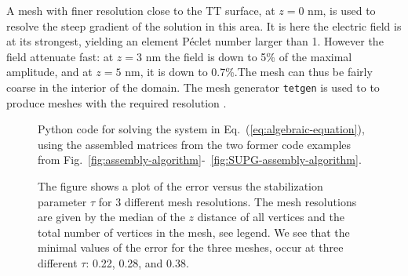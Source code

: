 A mesh with finer resolution close to the TT surface, at $z=0$ nm, is used to resolve the steep gradient of the solution in this area. It is here the electric field is at its strongest, yielding an element P\'eclet number larger than 1. However the field attenuate fast: at $z=3$ nm the field is down to 5\% of the maximal amplitude, and at $z=5$ nm, it is down to 0.7\%.The mesh can thus be fairly coarse in the interior of the domain. The mesh generator \texttt{tetgen} is used to to produce meshes with the required resolution \cite{Si2007}.\par

\begin{figure}
  \centering
  \vspace{-1.5em}
  \caption{Python code for solving the system in Eq.~(\ref{eq:algebraic-equation}), using the assembled matrices from the two former code examples from Fig.~\ref{fig:assembly-algorithm}-~\ref{fig:SUPG-assembly-algorithm}.}
  \label{fig:solving-algorithm}
\end{figure}

\newcommand{\leftfigsize}{0.66\linewidth}
\newcommand{\rightfigsize}{0.31\linewidth}

\begin{figure}[t]
    \begin{minipage}[t]{\leftfigsize}
    \end{minipage}
    \hfill
    \begin{minipage}{\rightfigsize}
      \caption{The figure shows a plot of the error versus the stabilization parameter $\tau$ for 3 different mesh resolutions. The mesh resolutions are given by the median of the $z$ distance of all vertices and the total number of vertices in the mesh, see legend. We see that the minimal values of the error for the three meshes, occur at three different $\tau$: 0.22, 0.28, and 0.38.}
      \label{fig:error_plot}
    \end{minipage}
\end{figure}

